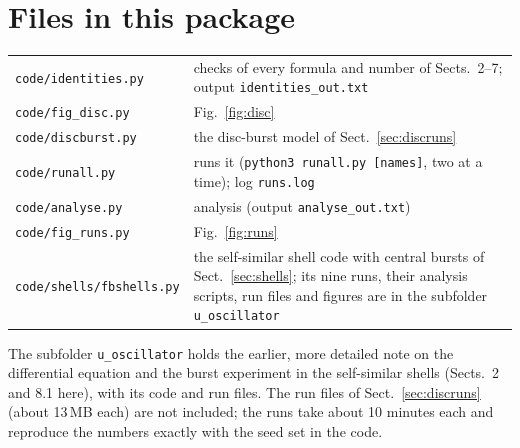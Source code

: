 \documentclass[11pt,a4paper]{article}
\theoremstyle{definition}
\theoremstyle{remark}
\begin{document}
\section*{Files in this package}
\begin{small}
\begin{tabular}{@{}lp{}@{}}
\texttt{code/identities.py} & checks of every formula and number of Sects.~2--7; output \texttt{identities\_out.txt}\\
\texttt{code/fig\_disc.py} & Fig.~\ref{fig:disc}\\
\texttt{code/discburst.py} & the disc-burst model of Sect.~\ref{sec:discruns}\\
\texttt{code/runall.py} & runs it (\texttt{python3 runall.py [names]}, two at a time); log \texttt{runs.log}\\
\texttt{code/analyse.py} & analysis (output \texttt{analyse\_out.txt})\\
\texttt{code/fig\_runs.py} & Fig.~\ref{fig:runs}\\
\texttt{code/shells/fbshells.py} & the self-similar shell code with central bursts of Sect.~\ref{sec:shells}; its nine runs, their analysis scripts, run files and figures are in the subfolder \texttt{u\_oscillator}\\
\end{tabular}
\end{small}

\medskip\noindent The subfolder \texttt{u\_oscillator} holds the earlier, more detailed note on
the differential equation and the burst experiment in the self-similar shells
(Sects.~2 and 8.1 here), with its code and run files. The run files of Sect.~\ref{sec:discruns} (about 13\,MB each) are not included; the runs take
about 10 minutes each and reproduce the numbers exactly with the seed set in the code.
\end{document}
